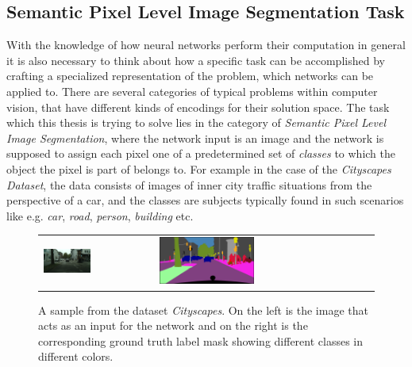 \subsection{Semantic Pixel Level Image Segmentation Task}
\label{sec:imseg}

With the knowledge of how neural networks perform their computation in general it is also necessary to think about how a specific task can be accomplished by crafting a specialized representation of the problem, which networks can be applied to.
There are several categories of typical problems within computer vision, that have different kinds of encodings for their solution space. The task which this thesis is trying to solve lies in the category of \emph{Semantic Pixel Level Image Segmentation}, where the network input is an image and the network is supposed to assign each pixel one of a predetermined set of \emph{classes} to which the object the pixel is part of belongs to. For example in the case of the \emph{Cityscapes Dataset}\cite{cordtsCityscapesDatasetSemantic2016a}, the data consists of images of inner city traffic situations from the perspective of a car, and the classes are subjects typically found in such scenarios like e.g. \emph{car}, \emph{road}, \emph{person}, \emph{building} etc.

\begin{figure}[htbp]
    \centering
    \begin{tabular}{ll}
        \includegraphics[width=0.45\textwidth]{images/aachen_000029_000019_leftImg8bit.png}
        &
        \includegraphics[width=0.45\textwidth]{images/aachen_000029_000019_gtFine_color.png}
    \end{tabular}
    \caption{A sample from the dataset \emph{Cityscapes}. On the left is the image that acts as an input for the network and on the right is the corresponding ground truth label mask showing different classes in different colors.}
    \label{fig:cityscapes_smpl}
\end{figure}

